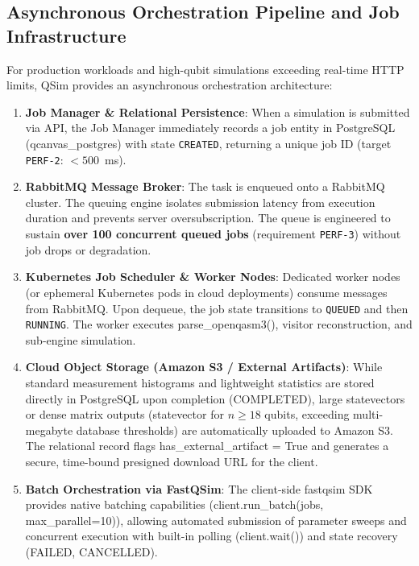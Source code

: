 \documentclass[runningheads]{llncs}
\begin{document}
\subsection{Asynchronous Orchestration Pipeline and Job Infrastructure}

For production workloads and high-qubit simulations exceeding real-time HTTP limits, QSim provides an asynchronous orchestration architecture:
\begin{enumerate}
    \item \textbf{Job Manager \& Relational Persistence}: When a simulation is submitted via API, the Job Manager immediately records a job entity in PostgreSQL (qcanvas\_postgres) with state \texttt{CREATED}, returning a unique job ID (target \texttt{PERF-2}: $<500$~ms).
    \item \textbf{RabbitMQ Message Broker}: The task is enqueued onto a RabbitMQ cluster. The queuing engine isolates submission latency from execution duration and prevents server oversubscription. The queue is engineered to sustain \textbf{over 100 concurrent queued jobs} (requirement \texttt{PERF-3}) without job drops or degradation.
    \item \textbf{Kubernetes Job Scheduler \& Worker Nodes}: Dedicated worker nodes (or ephemeral Kubernetes pods in cloud deployments) consume messages from RabbitMQ. Upon dequeue, the job state transitions to \texttt{QUEUED} and then \texttt{RUNNING}. The worker executes parse\_openqasm3(), visitor reconstruction, and sub-engine simulation.
    \item \textbf{Cloud Object Storage (Amazon S3 / External Artifacts)}: While standard measurement histograms and lightweight statistics are stored directly in PostgreSQL upon completion (COMPLETED), large statevectors or dense matrix outputs (statevector for $n \ge 18$ qubits, exceeding multi-megabyte database thresholds) are automatically uploaded to Amazon S3. The relational record flags has\_external\_artifact = True and generates a secure, time-bound presigned download URL for the client.
    \item \textbf{Batch Orchestration via FastQSim}: The client-side fastqsim SDK provides native batching capabilities (client.run\_batch(jobs, max\_parallel=10)), allowing automated submission of parameter sweeps and concurrent execution with built-in polling (client.wait()) and state recovery (FAILED, CANCELLED).
\end{enumerate}

\end{document}
